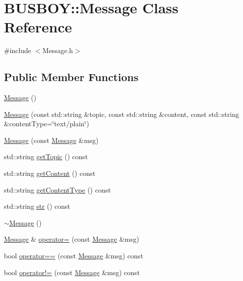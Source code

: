 \hypertarget{classBUSBOY_1_1Message}{
\section{BUSBOY::Message Class Reference}
\label{classBUSBOY_1_1Message}
}


{\ttfamily \#include $<$Message.h$>$}\subsection*{Public Member Functions}
\begin{DoxyCompactItemize}
\item 
\hyperlink{classBUSBOY_1_1Message_a3912e97d8f7dc2dcf2f2aaf2169cec41}{Message} ()
\item 
\hyperlink{classBUSBOY_1_1Message_a989563a7637c292afd0cf2442458c121}{Message} (const std::string \&topic, const std::string \&content, const std::string \&contentType=\char`\"{}text/plain\char`\"{})
\item 
\hyperlink{classBUSBOY_1_1Message_ac7b26859647f2bab027e1c6cee5f1864}{Message} (const \hyperlink{classBUSBOY_1_1Message}{Message} \&msg)
\item 
std::string \hyperlink{classBUSBOY_1_1Message_a1093e23545abce1e47aba096d2264272}{getTopic} () const 
\item 
std::string \hyperlink{classBUSBOY_1_1Message_a9b95e16e29513c76a19ca90adadf9f37}{getContent} () const 
\item 
std::string \hyperlink{classBUSBOY_1_1Message_ac01b481064561c79e0f1bb65b874275d}{getContentType} () const 
\item 
std::string \hyperlink{classBUSBOY_1_1Message_a1141a5691320a82d3b3d26e83461448d}{str} () const 
\item 
\hyperlink{classBUSBOY_1_1Message_a2abcd82dbfb9d51bdd7bd3c9eac7ca43}{$\sim$Message} ()
\item 
\hyperlink{classBUSBOY_1_1Message}{Message} \& \hyperlink{classBUSBOY_1_1Message_aa88bb972d6ced3dc18b1baf3818b6b2e}{operator=} (const \hyperlink{classBUSBOY_1_1Message}{Message} \&msg)
\item 
bool \hyperlink{classBUSBOY_1_1Message_aab2b11902dcf1b0a95f5fb7b31937db9}{operator==} (const \hyperlink{classBUSBOY_1_1Message}{Message} \&msg) const 
\item 
bool \hyperlink{classBUSBOY_1_1Message_a9196bb4e88129511e0e77b0f57a85494}{operator!=} (const \hyperlink{classBUSBOY_1_1Message}{Message} \&msg) const 
\end{DoxyCompactItemize}


